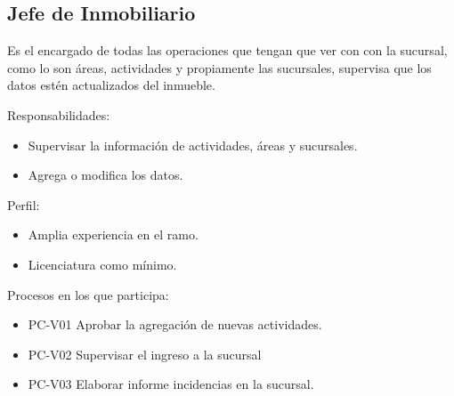 \begin{Usuario}{\subsection{Jefe de Inmobiliario}}{
		Es el encargado de todas las operaciones que tengan que ver con con la sucursal, como lo son áreas, actividades y propiamente las sucursales, supervisa que los datos estén actualizados del inmueble.
	}
		\item[Responsabilidades:] \cdtEmpty
	\begin{itemize}
		\item Supervisar la información de actividades, áreas y sucursales.
		\item Agrega o modifica los datos.
	\end{itemize}
	
	\item[Perfil:] \cdtEmpty
	\begin{itemize}
		\item Amplia experiencia en el ramo.
		\item Licenciatura como mínimo.
	\end{itemize}
	\item[Procesos en los que participa:] \cdtEmpty
	\begin{itemize}
		\item PC-V01 Aprobar la agregación de nuevas actividades.
		\item PC-V02 Supervisar el ingreso a la sucursal
		\item PC-V03 Elaborar informe incidencias en la sucursal.
	\end{itemize}
\end{Usuario}


